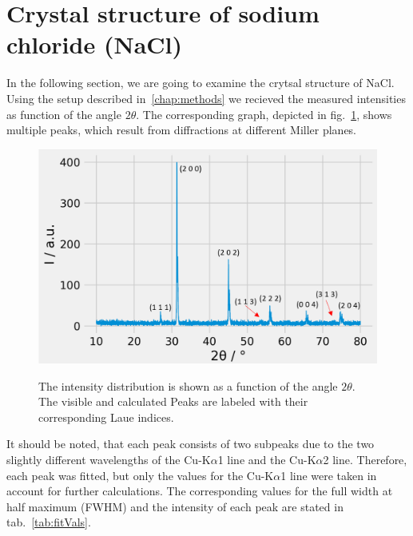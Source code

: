 
\newpage

\section{Crystal structure of sodium chloride (NaCl)}
\label{sec:NaCl}


In the following section, we are going to examine the crytsal structure of NaCl. Using the setup described in~\ref{chap:methods} we recieved the measured intensities as function of the angle $2\theta$. The corresponding graph, depicted in fig.~\ref{fig:Peaks}, shows multiple peaks, which result from diffractions at different Miller planes.  

\begin{figure}[ht]
    \centering
    \includegraphics[angle = 90, width = 0.8\linewidth]{Bilder/Auswertung/NaCl/Ivs2thwIndices.png}
    \label{fig:Peaks}
    \caption{The intensity distribution is shown as a function of the angle $2\theta$. The visible and calculated Peaks are labeled with their corresponding Laue indices.}
\end{figure}

It should be noted, that each peak consists of two subpeaks due to the two slightly different wavelengths of the Cu-K$\alpha$1 line and the Cu-K$\alpha$2 line. Therefore, each peak was fitted, but only the values for the Cu-K$\alpha$1 line were taken in account for further calculations. The corresponding values for the full width at half maximum (FWHM) and the intensity of each peak are stated in tab.~\ref{tab:fitVals}.

